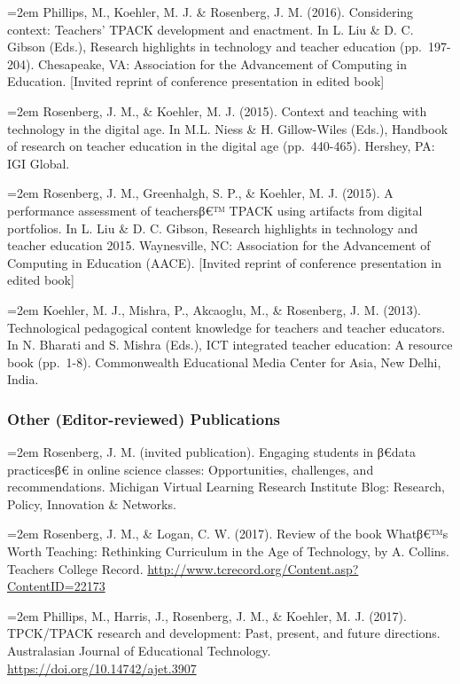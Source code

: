 \documentclass[]{article}
\newcommand{\euro}{€}
\begin{document}
\hangindent=2em Phillips, M., Koehler, M. J. \& Rosenberg, J. M. (2016).
Considering context: Teachers' TPACK development and enactment. In L.
Liu \& D. C. Gibson (Eds.), Research highlights in technology and
teacher education (pp.~197-204). Chesapeake, VA: Association for the
Advancement of Computing in Education. {[}Invited reprint of conference
presentation in edited book{]}

\hangindent=2em Rosenberg, J. M., \& Koehler, M. J. (2015). Context and
teaching with technology in the digital age. In M.L. Niess \& H.
Gillow-Wiles (Eds.), Handbook of research on teacher education in the
digital age (pp.~440-465). Hershey, PA: IGI Global.

\hangindent=2em Rosenberg, J. M., Greenhalgh, S. P., \& Koehler, M. J.
(2015). A performance assessment of teachersβ\euro{}™ TPACK using
artifacts from digital portfolios. In L. Liu \& D. C. Gibson, Research
highlights in technology and teacher education 2015. Waynesville, NC:
Association for the Advancement of Computing in Education (AACE).
{[}Invited reprint of conference presentation in edited book{]}

\hangindent=2em Koehler, M. J., Mishra, P., Akcaoglu, M., \& Rosenberg,
J. M. (2013). Technological pedagogical content knowledge for teachers
and teacher educators. In N. Bharati and S. Mishra (Eds.), ICT
integrated teacher education: A resource book (pp.~1-8). Commonwealth
Educational Media Center for Asia, New Delhi, India.

\subsubsection{Other (Editor-reviewed)
Publications}\label{other-editor-reviewed-publications}

\hangindent=2em Rosenberg, J. M. (invited publication). Engaging
students in β\euro{}data practicesβ\euro{} in online science classes:
Opportunities, challenges, and recommendations. Michigan Virtual
Learning Research Institute Blog: Research, Policy, Innovation \&
Networks.

\hangindent=2em Rosenberg, J. M., \& Logan, C. W. (2017). Review of the
book Whatβ\euro{}™s Worth Teaching: Rethinking Curriculum in the Age of
Technology, by A. Collins. Teachers College Record.
\url{http://www.tcrecord.org/Content.asp?ContentID=22173}

\hangindent=2em Phillips, M., Harris, J., Rosenberg, J. M., \& Koehler,
M. J. (2017). TPCK/TPACK research and development: Past, present, and
future directions. Australasian Journal of Educational Technology.
\url{https://doi.org/10.14742/ajet.3907}
\end{document}
